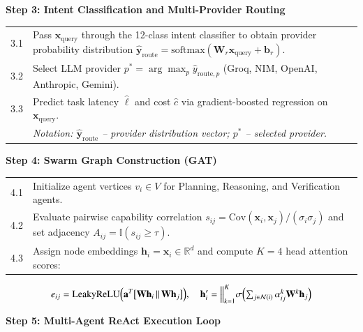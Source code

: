 \documentclass[12pt,a4paper]{report}
\begin{document}
\vspace{8pt}
\noindent\textbf{Step 3: Intent Classification and Multi-Provider Routing}
\vspace{4pt}

\noindent\begin{tabular}{p{1cm} p{12.5cm}}
3.1 & Pass $\mathbf{x}_{\text{query}}$ through the 12-class intent classifier to obtain provider probability distribution $\hat{\mathbf{y}}_{\text{route}} = \mathrm{softmax}(\mathbf{W}_{r}\mathbf{x}_{\text{query}} + \mathbf{b}_r)$. \\
3.2 & Select LLM provider $p^* = \arg\max_p \hat{y}_{\text{route},p}$ (Groq, NIM, OpenAI, Anthropic, Gemini). \\
3.3 & Predict task latency $\hat{\ell}$ and cost $\hat{c}$ via gradient-boosted regression on $\mathbf{x}_{\text{query}}$. \\
 & \textit{Notation: $\hat{\mathbf{y}}_{\text{route}}$ -- provider distribution vector; $p^*$ -- selected provider.} \\
\end{tabular}

\vspace{8pt}
\noindent\textbf{Step 4: Swarm Graph Construction (GAT)}
\vspace{4pt}

\noindent\begin{tabular}{p{1cm} p{12.5cm}}
4.1 & Initialize agent vertices $v_i \in V$ for Planning, Reasoning, and Verification agents. \\
4.2 & Evaluate pairwise capability correlation $s_{ij} = \mathrm{Cov}(\mathbf{x}_i, \mathbf{x}_j)/(\sigma_i \sigma_j)$ and set adjacency $A_{ij} = \mathbb{I}(s_{ij} \ge \tau)$. \\
4.3 & Assign node embeddings $\mathbf{h}_i = \mathbf{x}_i \in \mathbb{R}^d$ and compute $K{=}4$ head attention scores: \\
\end{tabular}
\begin{equation}
    e_{ij} = \mathrm{LeakyReLU}\Big(\mathbf{a}^T \big[\mathbf{W}\mathbf{h}_i \,\Vert\, \mathbf{W}\mathbf{h}_j\big]\Big), \quad
    \mathbf{h}_i' = \Bigl\Vert_{k=1}^K \sigma\Bigl(\textstyle\sum_{j \in \mathcal{N}(i)} \alpha_{ij}^k \mathbf{W}^k \mathbf{h}_j\Bigr)
\end{equation}

\clearpage
\noindent\textbf{Step 5: Multi-Agent ReAct Execution Loop}
\vspace{4pt}
\end{document}

